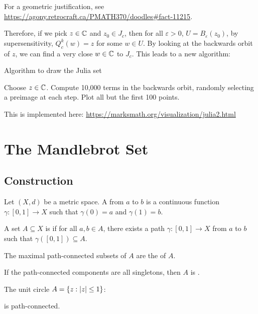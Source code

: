 \documentclass[class=pmath370,tikz,notes]{agony}
\begin{document}
For a geometric justification, see \href{https://agony.retrocraft.ca/PMATH370/doodles#fact-11215}{https://agony.retrocraft.ca/PMATH370/doodles\#fact-11215}.

Therefore, if we pick $z \in \mathbb{C}$ and $z_0 \in J_c$,
then for all $\varepsilon > 0$, $U = B_\varepsilon(z_0)$,
by supersensitivity, $Q_c^k(w) = z$ for some $w \in U$.
By looking at the backwards orbit of $z$,
we can find a very close $w \in \mathbb{C}$ to $J_c$.
This leads to a new algorithm:

\begin{algorithm}[H]
  \caption{Algorithm to draw the Julia set}
  \begin{algorithmic}[1]
    \State Choose $z \in \mathbb{C}$.
    \State Compute 10,000 terms in the backwards orbit,
    randomly selecting a preimage at each step.
    \State Plot all but the first 100 points.
  \end{algorithmic}
\end{algorithm}

This is implemented here: \href{https://marksmath.org/visualization/julia2.html}{https://marksmath.org/visualization/julia2.html}

\chapter{The Mandlebrot Set}

\section{Construction}

\begin{defn}
  Let $(X,d)$ be a metric space.
  A  from $a$ to $b$ is a continuous function
  $\gamma : [0,1] \to X$
  such that $\gamma(0) = a$ and $\gamma(1) = b$.

  A set $A \subseteq X$ is 
  if for all $a,b \in A$, there exists a path $\gamma : [0,1] \to X$
  from $a$ to $b$ such that $\gamma([0,1]) \subseteq A$.

  The maximal path-connected subsets of $A$
  are the  of $A$.

  If the path-connected components are all singletons,
  then $A$ is .
\end{defn}


\begin{example}
  The unit circle $A = \{z : \abs{z} \leq 1\}$:
  \begin{center}
  \end{center}
  is path-connected.
\end{example}
\end{document}
